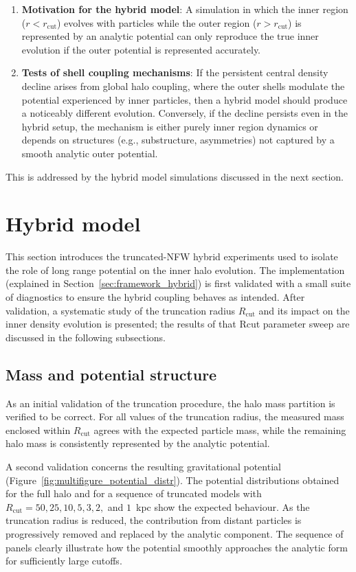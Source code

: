 \begin{enumerate}
\item \textbf{Motivation for the hybrid model}: A simulation in which the inner region ($r < r_{\mathrm{cut}}$) evolves with particles while the outer region ($r > r_{\mathrm{cut}}$) is represented by an analytic potential can only reproduce the true inner evolution if the outer potential is represented accurately.

\item \textbf{Tests of shell coupling mechanisms}: If the persistent central density decline arises from global halo coupling, where the outer shells modulate the potential experienced by inner particles, then a hybrid model should produce a noticeably different evolution. Conversely, if the decline persists even in the hybrid setup, the mechanism is either purely inner region dynamics or depends on structures (e.g., substructure, asymmetries) not captured by a smooth analytic outer potential.
\end{enumerate}

This is addressed by the hybrid model simulations discussed in the next section.

\section{Hybrid model}
\label{sec:results_truncated_nfw}
This section introduces the truncated-NFW hybrid experiments used to isolate the role of long range potential on the inner halo evolution. The implementation (explained in Section~\ref{sec:framework_hybrid}) is first validated with a small suite of diagnostics to ensure the hybrid coupling behaves as intended. After validation, a systematic study of the truncation radius $R_{\mathrm{cut}}$ and its impact on the inner density evolution is presented; the results of that Rcut parameter sweep are discussed in the following subsections.

\subsection{Mass and potential structure}
As an initial validation of the truncation procedure, the halo mass partition is verified to be correct. For all values of the truncation radius, the measured mass enclosed within $R_{\mathrm{cut}}$ agrees with the expected particle mass, while the remaining halo mass is consistently represented by the analytic potential.

A second validation concerns the resulting gravitational potential (Figure~\ref{fig:multifigure_potential_distr}). The potential distributions obtained for the full halo and for a sequence of truncated models with $R_{\mathrm{cut}} = 50, 25, 10, 5, 3, 2,$ and $1$~kpc show the expected behaviour. As the truncation radius is reduced, the contribution from distant particles is progressively removed and replaced by the analytic component. The sequence of panels clearly illustrate how the potential smoothly approaches the analytic form for sufficiently large cutoffs.

